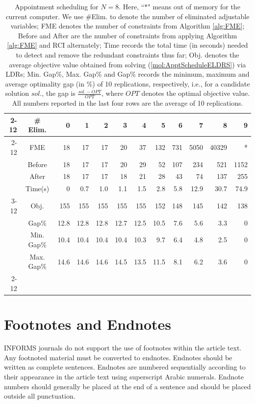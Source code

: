 \documentclass[fleqn,mnsc,blindrev]{informs4}
\begin{document}
		\begin{table}[t]
			\centering
			\caption{Appointment scheduling for $N=8$. Here, ``$*$" means out of memory for the current computer. We use \#Elim. to denote the number of eliminated adjustable variables; FME denotes the number of constraints from Algorithm \ref{alg:FME}; Before and After are the number of constraints from applying Algorithm \ref{alg:FME} and RCI alternately; Time records the total time (in seconds) needed to detect and remove the redundant constraints thus far; Obj. denotes the average objective value obtained from solving (\ref{mol:ApptScheduleELDRS}) via LDRs; Min. Gap\%, Max. Gap\% and Gap\% records the minimum, maximum and average optimality gap (in \%) of 10 replications, respectively, i.e., for a candidate solution $sol.$, the gap is $\frac{sol. - OPT}{OPT}$,  {where $OPT$ denotes the optimal objective value}. All numbers reported in the last four rows are the average of 10 replications.}
\def\arraystretch{1.3}			\begin{tabular}{rc|rrrrrrrrrr}
				\cline{2-12}
				& \# Elim. & 0     & 1     & 2     & 3     & 4     & 5     & 6     & 7     & 8     & 9 \\ \cline{2-12}
			 & FME   & 18    & 17    & 17    & 20    & 37    & 132   & 731   & 5050  & 40329 & * \\ 
				& Before & 18    & 17    & 17    & 20    & 29    & 52    & 107   & 234   & 521   & 1152 \\
				& After & 18    & 17    & 17    & 18    & 21    & 28    & 43    & 74    & 137   & 255 \\
				& Time(s)  & 0    & 0.7   & 1.0   & 1.1   & 1.5   & 2.8   & 5.8   & 12.9    & 30.7  & 74.9 \\ \cline{3-12}
				& Obj.  & 155   & 155   & 155   & 155   & 155   & 152   & 148   & 145   & 142   & 138 \\
				& Gap\% & 12.8  & 12.8  & 12.8  & 12.7  & 12.5  & 10.5  & 7.6   & 5.6   & 3.3   & 0 \\
				& Min. Gap\% & 10.4  & 10.4  & 10.4  & 10.4  & 10.3  & 9.7   & 6.4   & 4.8   & 2.5   & 0 \\
				& Max. Gap\% & 14.6  & 14.6  & 14.6  & 14.5  & 13.5  & 11.5  & 8.1   & 6.2   & 3.6   & 0 \\ \cline{2-12}
			\end{tabular}%
			\label{tab:AS}\vspace*{18pt}%
		\end{table}%

\section{Footnotes and Endnotes}\label{footsection1}
INFORMS journals do not support the use of footnotes within the article text. Any footnoted material must be converted to endnotes. Endnotes should be written as complete sentences. Endnotes are numbered sequentially according to their appearance in the article text using superscript Arabic numerals. Endnote numbers should generally be placed at the end of a sentence and should be placed outside all punctuation.
\end{document}
